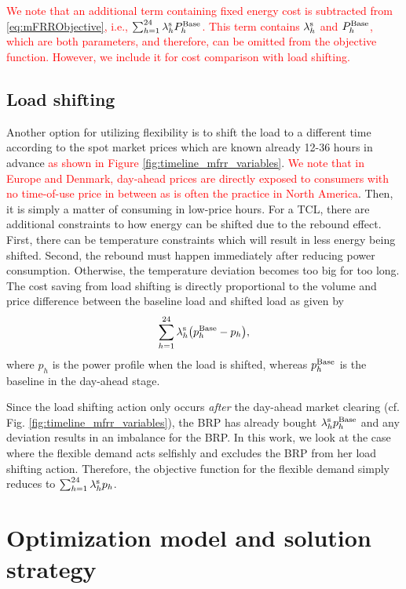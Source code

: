 \documentclass[11pt,a4paper]{article}
\begin{document}
\textcolor{red}{We note that an additional term containing fixed energy cost is subtracted from \eqref{eq:mFRRObjective}, i.e., $\sum_{h=1}^{24} \lambda^{\rm{s}}_{h}P^{\rm{Base}}_{h}$. This term contains $\lambda^{\rm{s}}_{h}$ and $P^{\rm{Base}}_{h}$, which are both parameters, and therefore, can be omitted from the objective function. However, we include it for cost comparison with load shifting.}

\subsection{Load shifting}
%
Another option for utilizing flexibility is to shift the load to a different time according to the spot market prices which are known already 12-36 hours in advance \textcolor{red}{as shown in Figure \ref{fig:timeline_mfrr_variables}}. \textcolor{red}{We note that in Europe and Denmark, day-ahead prices are directly exposed to consumers with no time-of-use price in between as is often the practice in North America}. Then, it is simply a matter of consuming in low-price hours.
%
For a TCL, there are additional constraints to how energy can be shifted due to the rebound effect. First, there can be temperature constraints which will result in less energy being shifted. Second, the rebound must happen immediately after reducing power consumption. Otherwise, the temperature deviation becomes too big for too long.
The cost saving from load shifting is directly proportional to the volume and price difference between the baseline load and shifted load as given by
%
\begin{equation}\label{eq:load_shifting_savings}
    \sum_{h=1}^{24} \lambda^{\rm{s}}_{h} \big(p^{\rm{Base}}_{h} -  p_{h}\big),
\end{equation}
%
where $p_{h}$ is the power profile when the load is shifted, whereas $p^{\rm{Base}}_{h}$ is the baseline in the day-ahead stage.

Since the load shifting action only occurs \textit{after} the day-ahead market clearing (cf. Fig. \ref{fig:timeline_mfrr_variables}), the BRP has already bought $\lambda^{\rm{s}}_{h} p^{\rm{Base}}_{h}$ and any deviation results in an imbalance for the BRP. In this work, we look at the case where the flexible demand acts selfishly and excludes the BRP from her load shifting action. Therefore, the objective function for the flexible demand simply reduces to $\sum_{h=1}^{24} \lambda_{h}^{\rm{s}} p_{h}$.


\section{Optimization model and solution strategy}\label{sec:OptimizationModel}
\end{document}
